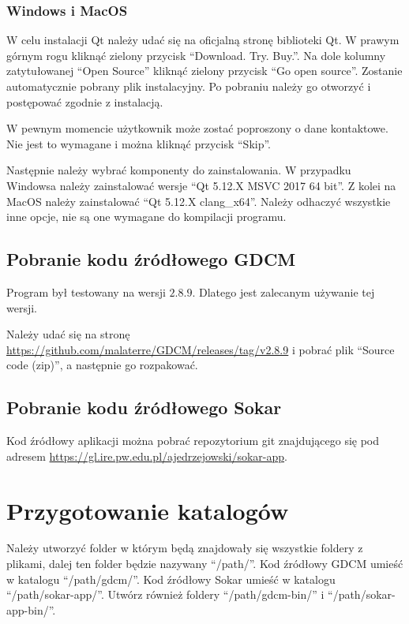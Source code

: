 \subsubsection*{Windows i MacOS}

\par
W celu instalacji Qt należy udać się na oficjalną stronę biblioteki Qt.
W prawym górnym rogu kliknąć zielony przycisk \enquote{Download. Try. Buy.}.
Na dole kolumny zatytułowanej \enquote{Open Source} kliknąć zielony przycisk \enquote{Go open source}.
Zostanie automatycznie pobrany plik instalacyjny.
Po pobraniu należy go otworzyć i postępować zgodnie z instalacją.
\par
W pewnym momencie użytkownik może zostać poproszony o dane kontaktowe.
Nie jest to wymagane i można kliknąć przycisk \enquote{Skip}.
\par
Następnie należy wybrać komponenty do zainstalowania.
W przypadku Windowsa należy zainstalować wersje \enquote{Qt 5.12.X MSVC 2017 64 bit}.
Z kolei na MacOS należy zainstalować \enquote{Qt 5.12.X clang\_x64}.
Należy odhaczyć wszystkie inne opcje, nie są one wymagane do kompilacji programu.

\subsection{Pobranie kodu źródłowego GDCM}

Program był testowany na wersji $2.8.9$.
Dlatego jest zalecanym używanie tej wersji.
\par
Należy udać się na stronę \url{https://github.com/malaterre/GDCM/releases/tag/v2.8.9} i pobrać plik \enquote{Source code (zip)}, a następnie go rozpakować.

\subsection{Pobranie kodu źródłowego Sokar}

Kod źródłowy aplikacji można pobrać repozytorium git znajdującego się pod adresem \url{https://gl.ire.pw.edu.pl/ajedrzejowski/sokar-app}.

\section{Przygotowanie katalogów}

Należy utworzyć folder w którym będą znajdowały się wszystkie foldery z plikami, dalej ten folder będzie nazywany \enquote{/path/}.
Kod źródłowy GDCM umieść w katalogu \enquote{/path/gdcm/}.
Kod źródłowy Sokar umieść w katalogu \enquote{/path/sokar-app/}.
Utwórz również foldery \enquote{/path/gdcm-bin/} i \enquote{/path/sokar-app-bin/}.

